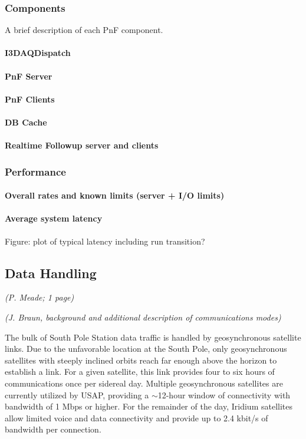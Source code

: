\subsubsection{Components}
A brief description of each PnF component.
\paragraph{I3DAQDispatch}
\paragraph{PnF Server}
\paragraph{PnF Clients}
\paragraph{DB Cache}
\paragraph{Realtime Followup server and clients}

\subsubsection{Performance}
\paragraph{Overall rates and known limits (server + I/O limits)}
\paragraph{Average system latency}

Figure: plot of typical latency including run transition?

\subsection{Data Handling}
\textsl{(P. Meade; 1 page)}

\textsl{(J. Braun, background and additional description of communications modes)}

The bulk of South Pole Station data traffic is handled by geosynchronous satellite links.  Due to the unfavorable
location at the South Pole, only geosynchronous satellites with steeply inclined orbits reach far enough above the
horizon to establish a link.  For a given satellite, this link provides four to six hours of communications once per
sidereal day.  Multiple geosynchronous satellites are currently utilized by USAP, providing a $\sim$12-hour window
of connectivity with bandwidth of 1 Mbps or higher.  For the remainder of the day, Iridium satellites allow
limited voice and data connectivity and provide up to 2.4 kbit/s of bandwidth per connection.

